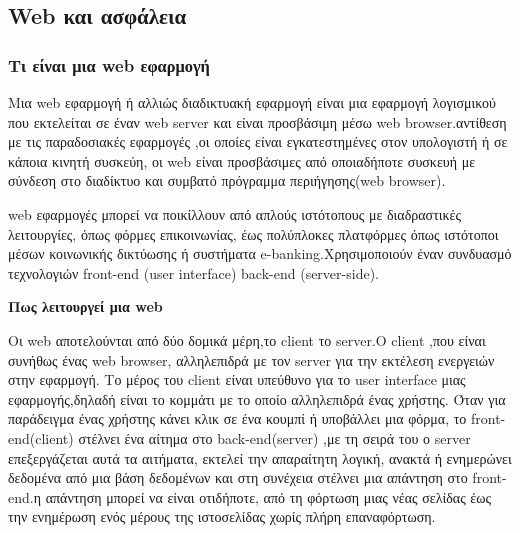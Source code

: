 \subsection{\lt Web  και ασφάλεια}
\subsubsection{Τι είναι μια \lt web \gt εφαρμογή}

Μια \lt web \gt εφαρμογή ή αλλιώς διαδικτυακή εφαρμογή είναι μια εφαρμογή λογισμικού που εκτελείται σε έναν \lt web server \gt και είναι προσβάσιμη μέσω \lt web browser. αντίθεση με τις παραδοσιακές εφαρμογές ,οι οποίες είναι εγκατεστημένες στον υπολογιστή ή σε κάποια κινητή συσκεύη, οι \lt web  είναι προσβάσιμες από οποιαδήποτε συσκευή με σύνδεση στο διαδίκτυο και συμβατό πρόγραμμα περιήγησης(\lt web browser).

 \lt web \gt εφαρμογές μπορεί να ποικίλλουν από απλούς ιστότοπους με διαδραστικές λειτουργίες, όπως φόρμες επικοινωνίας, έως πολύπλοκες πλατφόρμες όπως ιστότοποι μέσων κοινωνικής δικτύωσης ή συστήματα \lt e-banking\gt.Χρησιμοποιούν έναν συνδυασμό τεχνολογιών \lt front-end (user interface)  \lt back-end (server-side)\gt.

\begin{center}
    \textbf{Πως λειτουργεί μια \lt web }
\end{center}

Οι \lt web  αποτελούνται από δύο δομικά μέρη,το \lt client  το \lt server\gt.Ο \lt client \gt,που είναι συνήθως ένας \lt web browser\gt , αλληλεπιδρά με τον \lt server \gt για την εκτέλεση ενεργειών στην εφαρμογή. Το μέρος του \lt client \gt είναι υπεύθυνο για το \lt user interface \gt μιας εφαρμογής,δηλαδή είναι το κομμάτι με το οποίο αλληλεπιδρά ένας χρήστης. Όταν για παράδειγμα ένας χρήστης κάνει κλικ σε ένα κουμπί ή υποβάλλει μια φόρμα, το \lt front-end(client) \gt στέλνει ένα αίτημα στο \lt back-end(server) \gt ,με τη σειρά του ο \lt server \gt επεξεργάζεται αυτά τα αιτήματα, εκτελεί την απαραίτητη λογική, ανακτά ή ενημερώνει δεδομένα από μια βάση δεδομένων και στη συνέχεια στέλνει μια απάντηση στο \lt front-end. η απάντηση μπορεί να είναι οτιδήποτε, από τη φόρτωση μιας νέας σελίδας έως την ενημέρωση ενός μέρους της ιστοσελίδας χωρίς πλήρη επαναφόρτωση.


